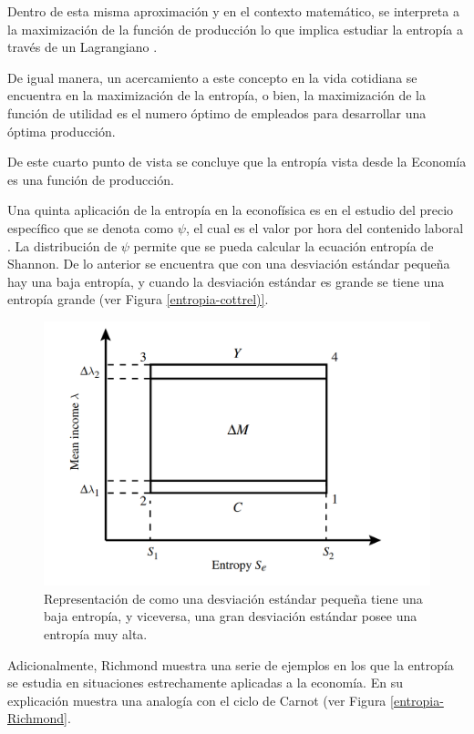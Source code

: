 Dentro de esta misma aproximación y en el contexto matemático, se interpreta a la maximización de la función de producción lo que implica estudiar la entropía a través de un Lagrangiano \citep[][página 205]{richmond} \citep[][página 150]{cottrell_classical_2009}.

De igual manera, un acercamiento a este concepto en la vida cotidiana se encuentra en la maximización  de la entropía, o bien, la maximización de la función de utilidad es el numero óptimo de empleados para desarrollar una óptima producción.

De este cuarto punto de vista se concluye que la entropía vista desde la Economía es una función de producción. 

Una quinta aplicación de la entropía en la econofísica es en el estudio del precio específico que se denota como $\psi$, el cual es el valor por hora del contenido laboral \citep[][]{cottrell_classical_2009}. La distribución de $\psi$ permite que se pueda calcular la ecuación entropía de Shannon. De lo anterior se encuentra que con una desviación estándar pequeña hay una baja entropía, y cuando la desviación estándar es grande se tiene una entropía grande \citep[][pagina 189]{cottrell_classical_2009} (ver Figura \ref{entropia-cottrel)}.

\begin{figure}
	\centering
	\includegraphics[width=0.7\linewidth]{figures/image_2023_05_02T13_03_47_409Z}
	\caption{Representación de como una desviación estándar pequeña tiene una baja entropía, y viceversa, una gran desviación estándar posee una entropía muy alta.}
	\label{entropia-cottrel}
\end{figure}


Adicionalmente, Richmond muestra una serie de ejemplos en los que la entropía se estudia en situaciones estrechamente aplicadas a la economía. En su explicación muestra una analogía con el ciclo de Carnot (ver Figura \ref{entropia-Richmond}. 


